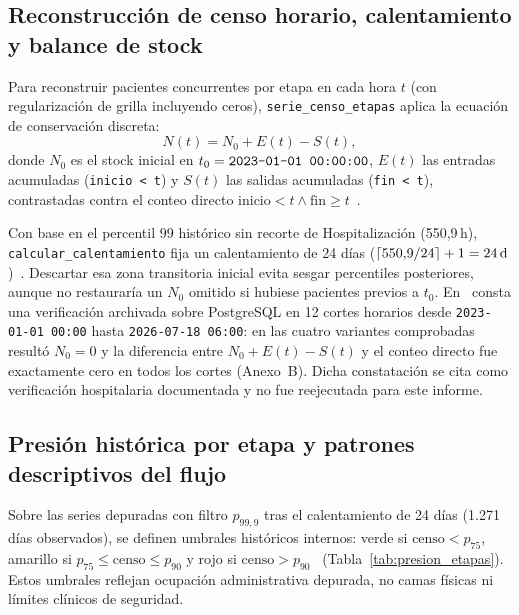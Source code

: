 \subsection{Reconstrucción de censo horario, calentamiento y balance de stock}

Para reconstruir pacientes concurrentes por etapa en cada hora $t$ (con regularización de grilla incluyendo ceros), \texttt{serie\_censo\_etapas} aplica la ecuación de conservación discreta:
\begin{equation}
\label{eq:balance_censo}
N(t) = N_0 + E(t) - S(t),
\end{equation}
donde $N_0$ es el stock inicial en $t_0 = \text{\texttt{2023-01-01 00:00:00}}$, $E(t)$ las entradas acumuladas (\texttt{inicio < t}) y $S(t)$ las salidas acumuladas (\texttt{fin < t}), contrastadas contra el conteo directo $\text{inicio} < t \land \text{fin} \ge t$~\cite{mediflow2026informe,mediflow2026saturacion}.

Con base en el percentil 99 histórico sin recorte de Hospitalización (550,9\,h), \texttt{calcular\_calentamiento} fija un calentamiento de 24 días ($\lceil 550{,}9 / 24 \rceil + 1 = 24\text{\,d}$)~\cite{mediflow2026saturacion}. Descartar esa zona transitoria inicial evita sesgar percentiles posteriores, aunque no restauraría un $N_0$ omitido si hubiese pacientes previos a $t_0$. En~\cite{mediflow2026informe} consta una verificación archivada sobre PostgreSQL en 12 cortes horarios desde \texttt{2023-01-01 00:00} hasta \texttt{2026-07-18 06:00}: en las cuatro variantes comprobadas resultó $N_0 = 0$ y la diferencia entre $N_0 + E(t) - S(t)$ y el conteo directo fue exactamente cero en todos los cortes (Anexo~B). Dicha constatación se cita como verificación hospitalaria documentada y no fue reejecutada para este informe.

\subsection{Presión histórica por etapa y patrones descriptivos del flujo}

Sobre las series depuradas con filtro $p_{99{,}9}$ tras el calentamiento de 24 días (1.271 días observados), se definen umbrales históricos internos: verde si $\text{censo} < p_{75}$, amarillo si $p_{75} \le \text{censo} \le p_{90}$ y rojo si $\text{censo} > p_{90}$~\cite{mediflow2026saturacion} (Tabla~\ref{tab:presion_etapas}). Estos umbrales reflejan ocupación administrativa depurada, no camas físicas ni límites clínicos de seguridad.

